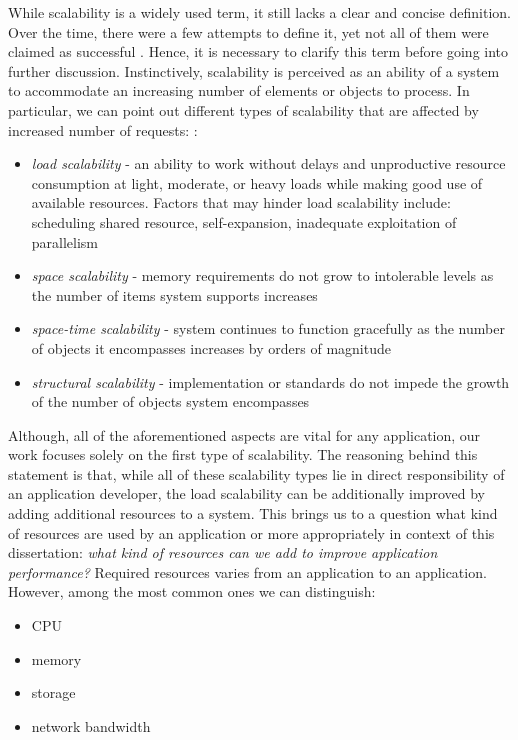 While scalability is a widely used term, it still lacks a clear and concise definition. Over the time, there were a few attempts to define it, yet not all of them were claimed as successful \cite{Hi90} \cite{DuRoWi06}. Hence, it is necessary to clarify this term before going into further discussion. Instinctively, scalability is perceived as an ability of a system to accommodate an increasing number of elements or objects to process. In particular, we can point out different types of scalability that are affected by increased number of requests: \cite{Bo00}:
\begin{itemize}
	\item \textit{load scalability} - an ability to work without delays and unproductive resource consumption at light, moderate, or heavy loads while making good use of available resources. Factors that may hinder load scalability include: scheduling shared resource, self-expansion, inadequate exploitation of parallelism
	\item \textit{space scalability} - memory requirements do not grow to intolerable levels as the number of items system supports increases
	\item \textit{space-time scalability} - system continues to function gracefully as the number of objects it encompasses increases by orders of magnitude
	\item \textit{structural scalability} - implementation or standards do not impede the growth of the number of objects system encompasses
\end{itemize}
Although, all of the aforementioned aspects are vital for any application, our work focuses solely on the first type of scalability. The reasoning behind this statement is that, while all of these scalability types lie in direct responsibility of an application developer, the load scalability can be additionally improved by adding additional resources to a system. This brings us to a question what kind of resources are used by an application or more appropriately in context of this dissertation: \textit{what kind of resources can we add to improve application performance?} Required resources varies from an application to an application. However, among the most common ones we can distinguish:
\begin{itemize}
	\item CPU
	\item memory
	\item storage
	\item network bandwidth
\end{itemize}

